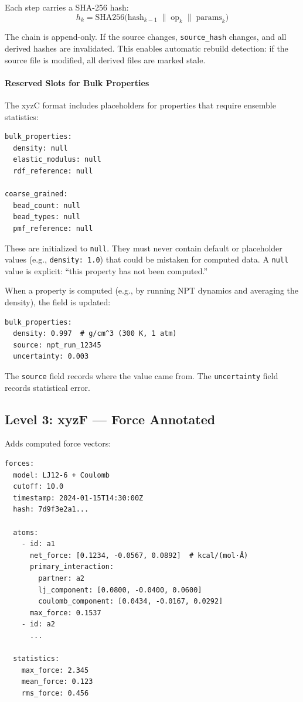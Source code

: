 \documentclass[11pt]{article}
\begin{document}
Each step carries a SHA-256 hash:
\begin{equation}
h_k = \text{SHA256}\bigl(\text{hash}_{k-1} \;\|\; \text{op}_k \;\|\; \text{params}_k\bigr)
\end{equation}

The chain is append-only. If the source changes, \texttt{source\_hash} changes, and all derived hashes are invalidated. This enables automatic rebuild detection: if the source file is modified, all derived files are marked stale.

\paragraph{Reserved Slots for Bulk Properties}

The xyzC format includes placeholders for properties that require ensemble statistics:
\begin{lstlisting}
bulk_properties:
  density: null
  elastic_modulus: null
  rdf_reference: null

coarse_grained:
  bead_count: null
  bead_types: null
  pmf_reference: null
\end{lstlisting}

These are initialized to \texttt{null}. They must never contain default or placeholder values (e.g., \texttt{density: 1.0}) that could be mistaken for computed data. A \texttt{null} value is explicit: ``this property has not been computed.''

When a property is computed (e.g., by running NPT dynamics and averaging the density), the field is updated:
\begin{lstlisting}
bulk_properties:
  density: 0.997  # g/cm^3 (300 K, 1 atm)
  source: npt_run_12345
  uncertainty: 0.003
\end{lstlisting}

The \texttt{source} field records where the value came from. The \texttt{uncertainty} field records statistical error.

\subsection{Level 3: xyzF — Force Annotated}

Adds computed force vectors:
\begin{lstlisting}
forces:
  model: LJ12-6 + Coulomb
  cutoff: 10.0
  timestamp: 2024-01-15T14:30:00Z
  hash: 7d9f3e2a1...

  atoms:
    - id: a1
      net_force: [0.1234, -0.0567, 0.0892]  # kcal/(mol·Å)
      primary_interaction:
        partner: a2
        lj_component: [0.0800, -0.0400, 0.0600]
        coulomb_component: [0.0434, -0.0167, 0.0292]
      max_force: 0.1537
    - id: a2
      ...

  statistics:
    max_force: 2.345
    mean_force: 0.123
    rms_force: 0.456
\end{lstlisting}
\end{document}
